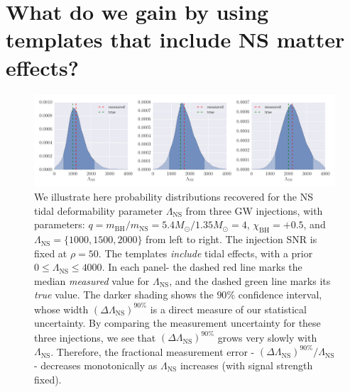 \documentclass[aps,prd,amsmath,floats,floatfix, twocolumn,
superscriptaddress,nofootinbib,showpacs]{revtex4-1}
\newcommand{\lambdans}{\Lambda_\mathrm{NS}}
\newcommand{\chibh}{\chi_\mathrm{BH}}
\newcommand{\mbh}{m_\mathrm{BH}}
\newcommand{\mns}{m_\mathrm{NS}}
\begin{document}
\section{What do we gain by using templates that include NS matter effects?}\label{s1:PEwithNS}
% 
\begin{figure}
\centering 
\includegraphics[width=1.9\columnwidth]{plots/SingleSystemLambdaVary_q4_0_mc2_25_chi0_50_snr50}
\caption{We illustrate here probability distributions recovered for the NS tidal
deformability parameter $\lambdans$ from three GW injections, with parameters:
$q = \mbh/\mns = 5.4M_\odot/1.35M_\odot = 4$, $\chibh=+0.5$, and 
$\lambdans=\{1000,1500,2000\}$ from left to right. The injection SNR is fixed at
$\rho=50$. The templates {\it include} tidal effects, with a prior $0\leq\lambdans\leq 4000$.
% 
In each panel- the dashed red line marks the median {\it measured} value for
$\lambdans$, and the dashed green line marks its {\it true} value.
The darker shading shows the $90\%$ confidence interval, whose width
$(\Delta\lambdans)^{90\%}$ is a direct measure of our statistical uncertainty.
By comparing the measurement uncertainty for these three injections, we see
that $(\Delta\lambdans)^{90\%}$ grows very slowly with $\lambdans$. Therefore,
the fractional measurement error - $(\Delta\lambdans)^{90\%}/\lambdans$ -
decreases monotonically as $\lambdans$ increases (with signal strength fixed).
% 
}
\label{fig:SingleSystemLambdaPDFvsSNR}
\end{figure}
\end{document}
